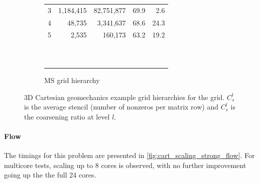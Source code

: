 \begin{figure} [htbp]
\begin{subfigure}[t]{0.48\textwidth}
\begin{tabular}{rrrrr}
			3 &  1,184,415 &    82,751,877 & 69.9 &  2.6 \\
			4 &     48,735 &     3,341,637 & 68.6 & 24.3 \\
			5 &      2,535 &       160,173 & 63.2 & 19.2 \\
			                                             \\
			                                             \\
			                                             \\
			                                             \\
			                                             \\
			                                             \\
			                                             \\
			                                             \\
			                                             \\
      \hline\noalign{\smallskip}
    \end{tabular}
    \caption{MS grid hierarchy}
  \end{subfigure}
  \caption[3D Cartesian geomechanics example grid hierarchies]{3D Cartesian geomechanics example grid hierarchies for the  grid.   $C_s^l$ is the average stencil (number of nonzeros per matrix row) and $C_r^l$ is the coarsening ratio at level $l$.}
  \label{fig:cart_grid_hiearchies}
\end{figure}

\paragraph{Flow}
The timings for this problem are presented in \cref{fig:cart_scaling_strong_flow}.   For multicore tests, scaling up to 8 cores is observed, with no further improvement going up the the full 24 cores.

